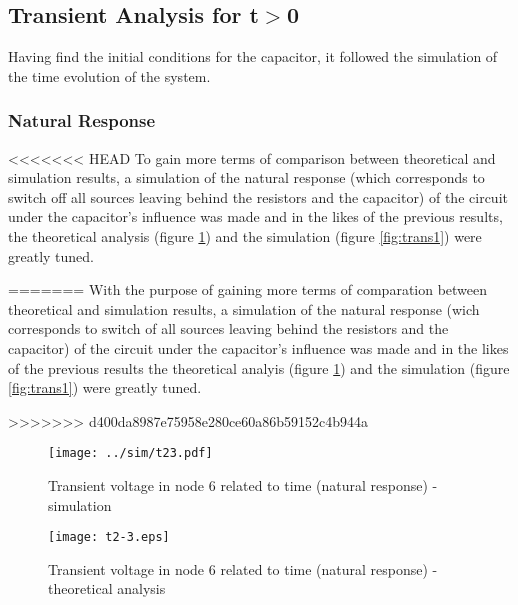 



\vspace{-3mm}
\subsection{Transient Analysis for t$>$0}

Having find the initial conditions for the capacitor, it followed the simulation of the time evolution of the system.

\subsubsection{Natural Response}

<<<<<<< HEAD
To gain more terms of comparison between theoretical and simulation results, a simulation of the natural response (which corresponds to switch off all sources leaving behind the resistors and the capacitor) of the circuit under the capacitor's influence was made and in the likes of the previous results, the theoretical analysis (figure \ref{fig:compnat}) and the simulation (figure \ref{fig:trans1}) were greatly tuned.

=======
With the purpose of gaining more terms of comparation between theoretical and simulation results, a simulation of the natural response (wich corresponds to switch of all sources leaving behind the resistors and the capacitor) of the circuit under the capacitor's influence was made and in the likes of the previous results the theoretical analyis (figure \ref{fig:compnat}) and the simulation (figure \ref{fig:trans1}) were greatly tuned.

\vspace{-70mm}
>>>>>>> d400da8987e75958e280ce60a86b59152c4b944a
\begin{figure}[h] \centering
  \begin{minipage}{.5\textwidth}
    \texttt{[image: ../sim/t23.pdf]}
    \caption{Transient voltage in node 6 related to time (natural response) - simulation}
    \label{fig:trans1}
    \end{minipage}%
  \begin{minipage}{.5\textwidth}
  \centering
    \texttt{[image: t2-3.eps]}
    \caption{Transient voltage in node 6 related to time (natural response) - theoretical analysis}
    \label{fig:compnat}
      \end{minipage}%
\end{figure}

